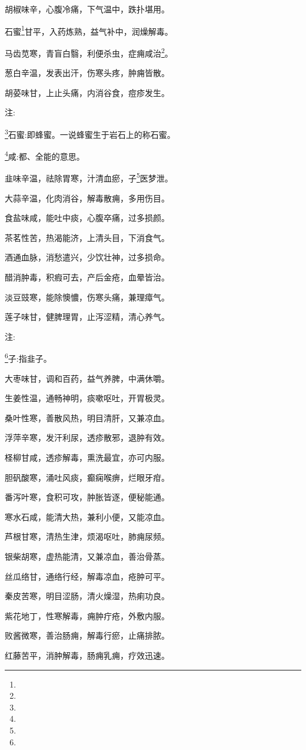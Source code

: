 \documentclass[a4paper,12pt,UTF8,twoside]{ctexbook}
\begin{document}
胡椒味辛，心腹冷痛，下气温中，跌扑堪用。

石蜜\footnote{}甘平，入药炼熟，益气补中，润燥解毒。

马齿苋寒，青盲白翳，利便杀虫，症痈咸治\footnote{}。

葱白辛温，发表出汗，伤寒头疼，肿痈皆散。

胡荽味甘，上止头痛，内消谷食，痘疹发生。

注:

\footnote{}石蜜:即蜂蜜。一说蜂蜜生于岩石上的称石蜜。

\footnote{}咸:都、全能的意思。

韭味辛温，祛除胃寒，汁清血瘀，子\footnote{}医梦泄。

大蒜辛温，化肉消谷，解毒散痈，多用伤目。

食盐味咸，能吐中痰，心腹卒痛，过多损颜。

茶茗性苦，热渴能济，上清头目，下消食气。

酒通血脉，消愁遣兴，少饮壮神，过多损命。

醋消肿毒，积瘕可去，产后金疮，血晕皆治。

淡豆豉寒，能除懊憹，伤寒头痛，兼理瘴气。

莲子味甘，健脾理胃，止泻涩精，清心养气。

注:

\footnote{}子:指韭子。

大枣味甘，调和百药，益气养脾，中满休嚼。

生姜性温，通畅神明，痰嗽呕吐，开胃极灵。

桑叶性寒，善散风热，明目清肝，又兼凉血。

浮萍辛寒，发汗利尿，透疹散邪，退肿有效。

柽柳甘咸，透疹解毒，熏洗最宜，亦可内服。

胆矾酸寒，涌吐风痰，癫痫喉痹，烂眼牙疳。

番泻叶寒，食积可攻，肿胀皆逐，便秘能通。

寒水石咸，能清大热，兼利小便，又能凉血。

芦根甘寒，清热生津，烦渴呕吐，肺痈尿频。

银柴胡寒，虚热能清，又兼凉血，善治骨蒸。

丝瓜络甘，通络行经，解毒凉血，疮肿可平。

秦皮苦寒，明目涩肠，清火燥湿，热痢功良。

紫花地丁，性寒解毒，痈肿疔疮，外敷内服。

败酱微寒，善治肠痈，解毒行瘀，止痛排脓。

红藤苦平，消肿解毒，肠痈乳痈，疗效迅速。
\end{document}
